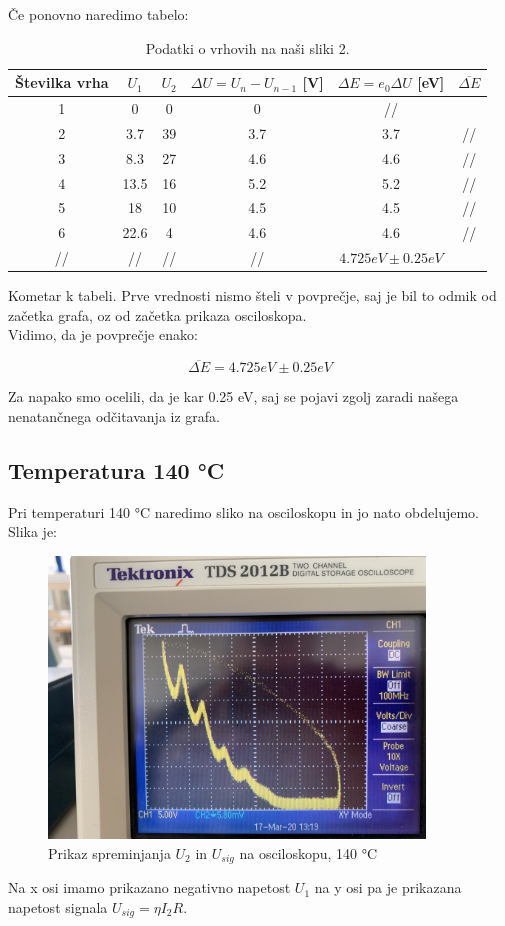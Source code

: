 \documentclass[11pt, a4paper]{article}
\theoremstyle{definition}
\theoremstyle{example}
\theoremstyle{izrek}
\begin{document}
Če ponovno naredimo tabelo: 
\begin{table}[h]
	\centering
	\begin{tabular}{|c|c|c|c|c|c|}
		\hline
		
		Številka vrha & $U_1$ & $U_2$ & $\Delta U = U_{n}- U_{n-1}$ [V] & $\Delta E= e_0\Delta U $ [eV] & $\overline{\Delta E}$\\
		\hline
		\hline
		1 & 0 & 0 & 0 & //\\
		\hline
		2 & 3.7 & 39 & 3.7 & 3.7 &// \\
		\hline
		3 & 8.3 & 27 & 4.6 & 4.6 & //\\
		\hline
		4 & 13.5 & 16 & 5.2 & 5.2 & //\\
		\hline
		5 & 18 & 10 & 4.5 & 4.5 &//\\
		\hline
		6 & 22.6 & 4 & 4.6 & 4.6 & //\\
		\hline
		//& //& //&// & $4.725 eV \pm 0.25 eV$\\ 
		\hline
		\hline
	\end{tabular}
	\caption{Podatki o vrhovih na naši sliki 2.}		\label{160 °C}
\end{table}
Kometar k tabeli. Prve vrednosti nismo šteli v povprečje, saj je bil to odmik od začetka grafa, oz od začetka prikaza osciloskopa. \\
Vidimo, da je povprečje enako: 

$$\overline{\Delta E}=4.725 eV \pm 0.25 eV$$

Za napako smo ocelili, da je kar 0.25 eV, saj se pojavi zgolj zaradi našega nenatančnega odčitavanja iz grafa.

\subsection{Temperatura 140 °C}
Pri temperaturi 140 °C naredimo sliko na osciloskopu in jo nato obdelujemo. Slika je: 

\begin{figure}[H]
    \centering
    \includegraphics[width=10cm]{T=140_max_napetost.jpg}
    \caption{Prikaz spreminjanja $U_2$ in $U_{sig}$ na osciloskopu, 140 °C}
\end{figure}
Na x osi imamo prikazano negativno napetost $U_1$ na y osi pa je prikazana napetost signala $U_{sig}=\eta I_2 R.$
\end{document}
